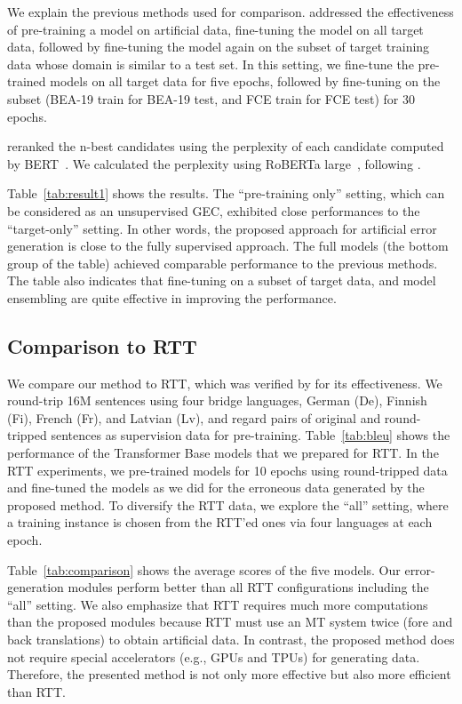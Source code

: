 \documentclass[11pt]{article}
\begin{document}
We explain the previous methods used for comparison.
\citet{choe-etal-2019-neural} addressed the effectiveness of pre-training a model on artificial data, fine-tuning the model on all target data,
followed by fine-tuning the model again on the subset of target training data whose domain is similar to a test set.
In this setting, we fine-tune the pre-trained models on all target data for five epochs, followed by fine-tuning on the subset (BEA-19 train for BEA-19 test, and FCE train for FCE test) for 30 epochs.

\citet{chollampatt-etal-2019-cross} reranked the n-best candidates using the perplexity of each candidate computed by BERT~\citep{devlin-etal-2019-bert}.
We calculated the perplexity using RoBERTa large~\citep{DBLP:journals/corr/abs-1907-11692}, following \citet{salazar-etal-2020-masked}.

Table~\ref{tab:result1} shows the results.
The ``pre-training only'' setting, which can be considered as an unsupervised GEC, exhibited close performances to the ``target-only'' setting.
In other words, the proposed approach for artificial error generation is close to the fully supervised approach.
The full models (the bottom group of the table) achieved comparable performance to the previous methods.
The table also indicates that fine-tuning on a subset of target data, and model ensembling are quite effective in improving the performance.

\subsection{Comparison to RTT}

We compare our method to RTT, which was verified by \citet{lichtarge-etal-2019-corpora} for its effectiveness.
We round-trip 16M sentences using four bridge languages, German (De), Finnish (Fi), French (Fr), and Latvian (Lv),
and regard pairs of original and round-tripped sentences as supervision data for pre-training.
Table~\ref{tab:bleu} shows the performance of the Transformer Base models that we prepared for RTT.
In the RTT experiments, we pre-trained models for 10 epochs using round-tripped data and fine-tuned the models as we did for the erroneous data generated by the proposed method.
To diversify the RTT data, we explore the ``all'' setting, where a training instance is chosen from the RTT'ed ones via four languages at each epoch.

Table~\ref{tab:comparison} shows the average scores of the five models.
Our error-generation modules perform better than all RTT configurations including the ``all'' setting.
We also emphasize that RTT requires much more computations than the proposed modules because RTT must use an MT system twice (fore and back translations) to obtain artificial data.
In contrast, the proposed method does not require special accelerators (e.g., GPUs and TPUs) for generating data.
Therefore, the presented method is not only more effective but also more efficient than RTT.
\end{document}
